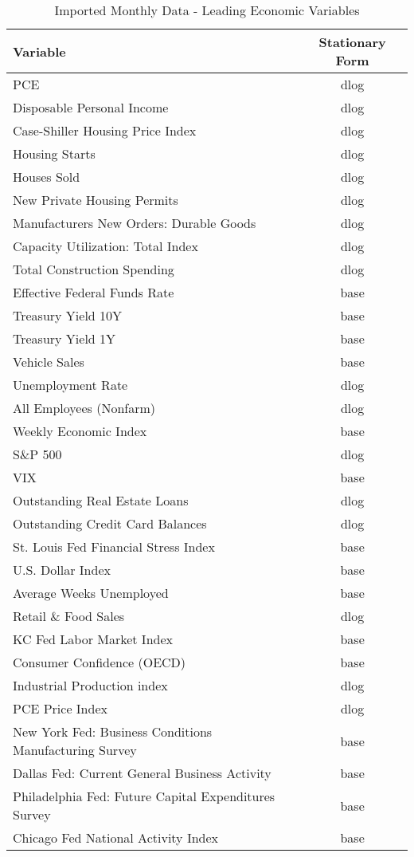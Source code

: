 \documentclass[11pt, letterpaper]{article}\usepackage[]{graphicx}\usepackage[]{color}
\begin{document}
\begin{table}[H]
\centering
\begingroup\scriptsize
\begin{tabular}{lc}
  \hline
Variable & Stationary Form \\ 
  \hline
PCE & dlog \\ 
  Disposable Personal Income & dlog \\ 
  Case-Shiller Housing Price Index & dlog \\ 
  Housing Starts & dlog \\ 
  Houses Sold & dlog \\ 
  New Private Housing Permits & dlog \\ 
  Manufacturers New Orders: Durable Goods & dlog \\ 
  Capacity Utilization: Total Index & dlog \\ 
  Total Construction Spending & dlog \\ 
  Effective Federal Funds Rate & base \\ 
  Treasury Yield 10Y & base \\ 
  Treasury Yield 1Y & base \\ 
  Vehicle Sales & base \\ 
  Unemployment Rate & dlog \\ 
  All Employees (Nonfarm) & dlog \\ 
  Weekly Economic Index & base \\ 
  S\&P 500 & dlog \\ 
  VIX & base \\ 
  Outstanding Real Estate Loans & dlog \\ 
  Outstanding Credit Card Balances & dlog \\ 
  St. Louis Fed Financial Stress Index & base \\ 
  U.S. Dollar Index & base \\ 
  Average Weeks Unemployed & base \\ 
  Retail \& Food Sales & dlog \\ 
  KC Fed Labor Market Index & base \\ 
  Consumer Confidence (OECD) & base \\ 
  Industrial Production index & dlog \\ 
  PCE Price Index & dlog \\ 
  New York Fed: Business Conditions Manufacturing Survey & base \\ 
  Dallas Fed: Current General Business Activity & base \\ 
  Philadelphia Fed: Future Capital Expenditures Survey & base \\ 
  Chicago Fed National Activity Index & base \\ 
   \hline
\end{tabular}
\endgroup
\caption{Imported Monthly Data - Leading Economic Variables} 
\end{table}
\end{document}
